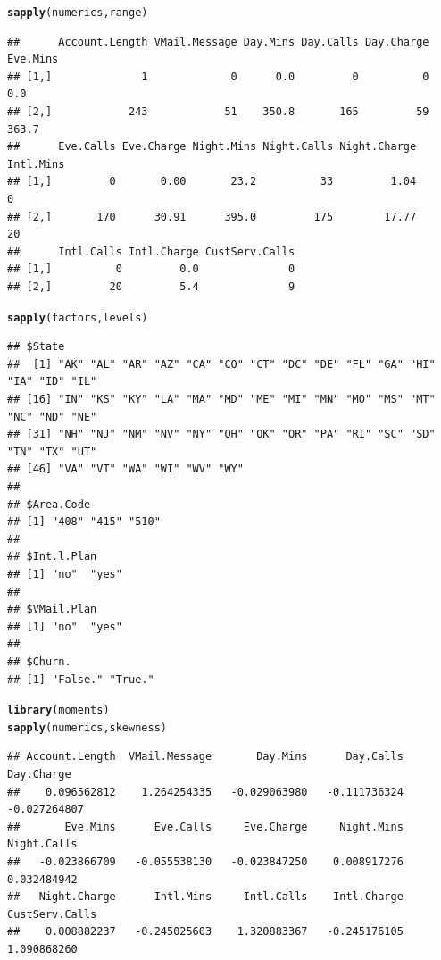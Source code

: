 \documentclass{article}\usepackage[]{graphicx}\usepackage[]{color}
\makeatletter
\newcommand{\hlstd}[1]{\textcolor[rgb]{0.345,0.345,0.345}{#1}}%
\newcommand{\hlkwd}[1]{\textcolor[rgb]{0.737,0.353,0.396}{\textbf{#1}}}%
\newenvironment{kframe}{%
 \def\at@end@of@kframe{}%
 \ifinner\ifhmode%
  \def\at@end@of@kframe{\end{minipage}}%
  \begin{minipage}{\columnwidth}%
 \fi\fi%
 \def\FrameCommand##1{\hskip\@totalleftmargin \hskip-\fboxsep
 \colorbox{shadecolor}{##1}\hskip-\fboxsep
     \hskip-\linewidth \hskip-\@totalleftmargin \hskip\columnwidth}%
 \MakeFramed {\advance\hsize-\width
   \@totalleftmargin\z@ \linewidth\hsize
   \@setminipage}}%
 {\par\unskip\endMakeFramed%
 \at@end@of@kframe}
\newenvironment{knitrout}{}{} %
\makeatother
\begin{document}
\begin{description}
\begin{knitrout}
\color{fgcolor}\begin{kframe}
\begin{alltt}
\hlkwd{sapply}\hlstd{(numerics, range)}
\end{alltt}
\begin{verbatim}
##      Account.Length VMail.Message Day.Mins Day.Calls Day.Charge Eve.Mins
## [1,]              1             0      0.0         0          0      0.0
## [2,]            243            51    350.8       165         59    363.7
##      Eve.Calls Eve.Charge Night.Mins Night.Calls Night.Charge Intl.Mins
## [1,]         0       0.00       23.2          33         1.04         0
## [2,]       170      30.91      395.0         175        17.77        20
##      Intl.Calls Intl.Charge CustServ.Calls
## [1,]          0         0.0              0
## [2,]         20         5.4              9
\end{verbatim}
\end{kframe}
\end{knitrout}

\begin{knitrout}
\color{fgcolor}\begin{kframe}
\begin{alltt}
\hlkwd{sapply}\hlstd{(factors, levels)}
\end{alltt}
\begin{verbatim}
## $State
##  [1] "AK" "AL" "AR" "AZ" "CA" "CO" "CT" "DC" "DE" "FL" "GA" "HI" "IA" "ID" "IL"
## [16] "IN" "KS" "KY" "LA" "MA" "MD" "ME" "MI" "MN" "MO" "MS" "MT" "NC" "ND" "NE"
## [31] "NH" "NJ" "NM" "NV" "NY" "OH" "OK" "OR" "PA" "RI" "SC" "SD" "TN" "TX" "UT"
## [46] "VA" "VT" "WA" "WI" "WV" "WY"
## 
## $Area.Code
## [1] "408" "415" "510"
## 
## $Int.l.Plan
## [1] "no"  "yes"
## 
## $VMail.Plan
## [1] "no"  "yes"
## 
## $Churn.
## [1] "False." "True."
\end{verbatim}
\end{kframe}
\end{knitrout}

\begin{knitrout}
\color{fgcolor}\begin{kframe}
\begin{alltt}
\hlkwd{library}\hlstd{(moments)}
\hlkwd{sapply}\hlstd{(numerics, skewness)}
\end{alltt}
\begin{verbatim}
## Account.Length  VMail.Message       Day.Mins      Day.Calls     Day.Charge 
##    0.096562812    1.264254335   -0.029063980   -0.111736324   -0.027264807 
##       Eve.Mins      Eve.Calls     Eve.Charge     Night.Mins    Night.Calls 
##   -0.023866709   -0.055538130   -0.023847250    0.008917276    0.032484942 
##   Night.Charge      Intl.Mins     Intl.Calls    Intl.Charge CustServ.Calls 
##    0.008882237   -0.245025603    1.320883367   -0.245176105    1.090868260
\end{verbatim}
\end{kframe}
\end{knitrout}


\end{description}
\end{document}
